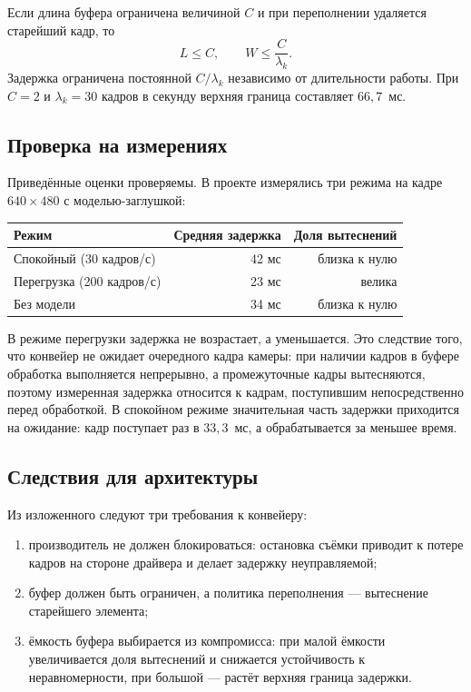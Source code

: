 \documentclass[11pt,a4paper]{article}
\theoremstyle{definition}
\theoremstyle{remark}
\begin{document}
Если длина буфера ограничена величиной $C$ и при переполнении удаляется
старейший кадр, то
\[
  L \le C, \qquad W \le \frac{C}{\lambda_k} .
\]
Задержка ограничена постоянной $C/\lambda_k$ независимо от длительности
работы. При $C = 2$ и $\lambda_k = 30$ кадров в секунду верхняя граница
составляет $66{,}7$~мс.

\subsection{Проверка на измерениях}

Приведённые оценки проверяемы. В проекте измерялись три режима на кадре
$640 \times 480$ с моделью-заглушкой:

\begin{center}
\begin{tabular}{lrr}
\toprule
Режим & Средняя задержка & Доля вытеснений \\
\midrule
Спокойный (30 кадров/с) & 42 мс & близка к нулю \\
Перегрузка (200 кадров/с) & 23 мс & велика \\
Без модели & 34 мс & близка к нулю \\
\bottomrule
\end{tabular}
\end{center}

В режиме перегрузки задержка не возрастает, а уменьшается. Это следствие
того, что конвейер не ожидает очередного кадра камеры: при наличии кадров в
буфере обработка выполняется непрерывно, а промежуточные кадры вытесняются,
поэтому измеренная задержка относится к кадрам, поступившим непосредственно
перед обработкой. В спокойном режиме значительная часть задержки приходится
на ожидание: кадр поступает раз в $33{,}3$~мс, а обрабатывается за меньшее
время.

\subsection{Следствия для архитектуры}

Из изложенного следуют три требования к конвейеру:

\begin{enumerate}
  \item производитель не должен блокироваться: остановка съёмки приводит к
        потере кадров на стороне драйвера и делает задержку неуправляемой;
  \item буфер должен быть ограничен, а политика переполнения --- вытеснение
        старейшего элемента;
  \item ёмкость буфера выбирается из компромисса: при малой ёмкости
        увеличивается доля вытеснений и снижается устойчивость к
        неравномерности, при большой --- растёт верхняя граница задержки.
\end{enumerate}
\end{document}
